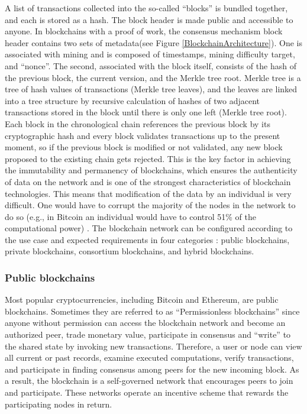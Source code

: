 A list of transactions collected into the so-called ``blocks'' is bundled together, and each is stored as a hash. The block header is made public and accessible to anyone. In blockchains with a proof of work, the consensus mechanism block header contains two sets of metadata(see Figure \ref{BlockchainArchitecture}). One is associated with mining and is composed of timestamps, mining difficulty target, and ``nonce''. The second, associated with the block itself, consists of the hash of the previous block, the current version, and the Merkle tree root\cite{BeyondBitcoin}. Merkle tree is a tree of hash values of transactions (Merkle tree leaves), and the leaves are linked into a tree structure by recursive calculation of hashes of two adjacent transactions stored in the block until there is only one left (Merkle tree root). Each block in the chronological chain references the previous block by its cryptographic hash and every block validates transactions up to the present moment, so if the previous block is modified or not validated, any new block proposed to the existing chain gets rejected\cite{BeyondBitcoin}. This is the key factor in achieving the immutability and permanency of blockchains, which ensures the authenticity of data on the network and is one of the strongest characteristics of blockchain technologies. This means that modification of the data by an individual is very difficult. One would have to corrupt the majority of the nodes in the network to do so (e.g., in Bitcoin an individual would have to control 51\% of the computational power) \cite{MajorityIsNotEnough}. The blockchain network can be configured according to the use case and expected requirements in four categories \cite{BlockchainInOperationsManagement}: public blockchains, private blockchains, consortium blockchains, and hybrid blockchains.


\subsubsection{Public blockchains}
Most popular cryptocurrencies, including Bitcoin and Ethereum, are public blockchains. Sometimes they are referred to as ``Permissionless blockchains'' since anyone without permission can access the blockchain network and become an authorized peer, trade monetary value, participate in consensus and ``write” to the shared state by invoking new transactions\cite{ConsensusInTheWild}. Therefore, a user or node can view all current or past records, examine executed computations, verify transactions, and participate in finding consensus among peers for the new incoming block. As a result, the blockchain is a self-governed network that encourages peers to join and participate. These networks operate an incentive scheme that rewards the participating nodes in return.


